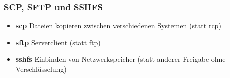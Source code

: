 \begin{frame}
\frametitle{SCP, SFTP und SSHFS}
\begin{itemize}
\item \textbf{scp} Dateien kopieren zwischen verschiedenen Systemen (statt rcp)
\pause
\item \textbf{sftp} Serverclient (statt ftp)
\pause
\item \textbf{sshfs} Einbinden von Netzwerkspeicher (statt anderer Freigabe ohne Verschlüsselung)
\end{itemize}
\end{frame}